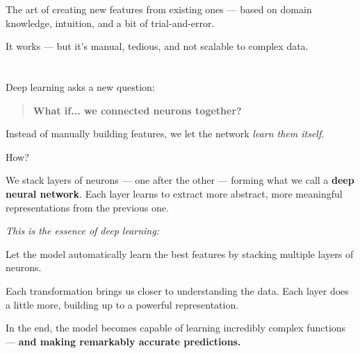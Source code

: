 \documentclass[11pt]{article}
\begin{document}
\vspace{1em}

\begin{tcolorbox}[colback=yellow!5, colframe=yellow!80!black, title=Feature Engineering]
The art of creating new features from existing ones — based on domain knowledge, intuition, and a bit of trial-and-error.
\end{tcolorbox}

\vspace{1em}

It works — but it’s manual, tedious, and not scalable to complex data.

\vspace{2em}

\section*{}

Deep learning asks a new question:

\begin{quote}
\textbf{What if... we connected neurons together?}
\end{quote}

Instead of manually building features, we let the network \textit{learn them itself}.

How?

We stack layers of neurons — one after the other — forming what we call a \textbf{deep neural network}.  
Each layer learns to extract more abstract, more meaningful representations from the previous one.

\vspace{1em}

\textit{This is the essence of deep learning:}

\begin{tcolorbox}[colback=green!5, colframe=green!60!black, title=Key Idea]
Let the model automatically learn the best features by stacking multiple layers of neurons.
\end{tcolorbox}

\vspace{1em}

Each transformation brings us closer to understanding the data.  
Each layer does a little more, building up to a powerful representation.

In the end, the model becomes capable of learning incredibly complex functions —  
\textbf{and making remarkably accurate predictions.}
\end{document}
